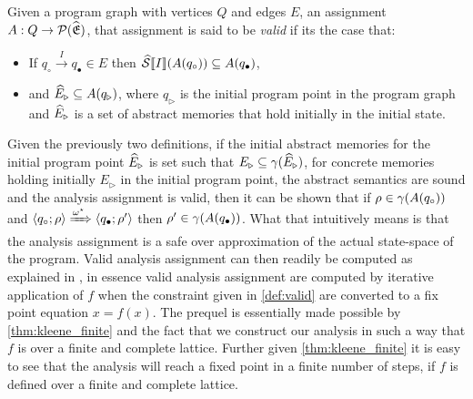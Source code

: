 \begin{definition}\label{def:valid}
    Given a program graph with vertices $Q$ and edges $E$, an assignment $A : Q \rightarrow \mathcal{P}(\widehat{\mathfrak{E}})$, that assignment is said to be \emph{valid} if its the case that:
    \begin{itemize}
        \item If $q_\circ \xrightarrow{I} q_\bullet \in E$ then $\widehat{\mathcal{S}} \llbracket I \rrbracket(A(q_\circ)) \subseteq A(q_\bullet)$,
        \item and $\widehat{E}_\triangleright \subseteq A(q_\triangleright)$, where $q_\triangleright$ is the initial program point in the program graph and $\widehat{E}_\triangleright$ is a set of abstract memories that hold initially in the initial state.
    \end{itemize}
\end{definition}

Given the previously two definitions, if the initial abstract memories for the initial program point $\widehat{E}_\triangleright$ is set such that $E_{\triangleright} \subseteq \gamma(\widehat{E}_\triangleright)$, for concrete memories holding initially $E_{\triangleright}$ in the initial program point, the abstract semantics are sound and the analysis assignment is valid, then it can be shown that if $\rho \in \gamma(A(q_\circ))$ and $\langle q_\circ; \rho \rangle \xRightarrow{\omega^\star} \langle q_\bullet; \rho' \rangle$ then $\rho' \in \gamma(A(q_\bullet))$.
What that intuitively means is that the analysis assignment is a safe over approximation of the actual state-space of the program.
Valid analysis assignment can then readily be computed as explained in \cite{nielson_formal_2019}, in essence valid analysis assignment are computed by iterative application of $f$ when the constraint given in \autoref{def:valid} are converted to a fix point equation $x = f(x)$.
The prequel is essentially made possible by \autoref{thm:kleene_finite} and the fact that we construct our analysis in such a way that $f$ is over a finite and complete lattice.
Further given \autoref{thm:kleene_finite} it is easy to see that the analysis will reach a fixed point in a finite number of steps, if $f$ is defined over a finite and complete lattice.


